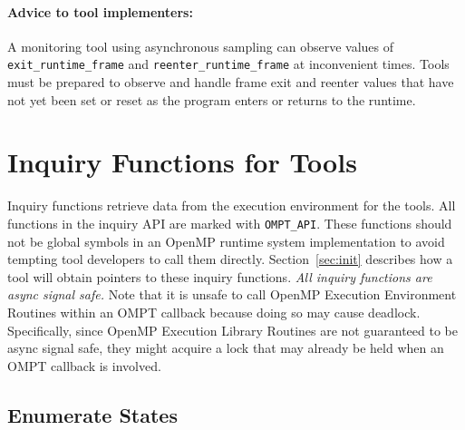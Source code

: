 \documentclass{article}
\begin{document}

\paragraph{Advice to tool implementers:} A monitoring tool using
      asynchronous sampling can observe values of 
      \verb|exit_runtime_frame| and \verb|reenter_runtime_frame| at inconvenient times. 
      Tools must be prepared to observe and handle frame exit and reenter values that have not yet been set or reset as the program enters or returns to the runtime. 


 
 

\section{Inquiry Functions for Tools}
\label{sec:inquiry}

 Inquiry functions retrieve data from the execution environment for
 the tools. 
 All functions in the inquiry API are marked with \verb|OMPT_API|. These functions should not be global symbols in an OpenMP runtime system implementation to avoid tempting tool developers to call them directly. Section~\ref{sec:init} describes how a tool will obtain pointers to these inquiry functions.
 {\em All inquiry functions are async signal safe.} 
 Note that it is unsafe to call OpenMP Execution Environment Routines within an OMPT callback because doing so may cause deadlock. 
 Specifically, since OpenMP Execution Library Routines are not guaranteed to be async signal safe, they might acquire a lock that may already be held when an OMPT callback is involved.
 
 \subsection{Enumerate States}
 \label{ompt_enumerate_state}
 
\end{document}
